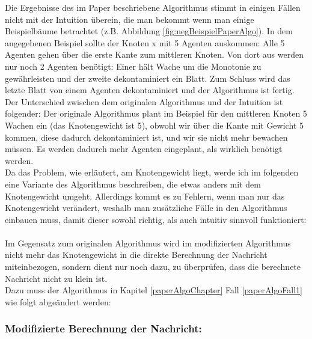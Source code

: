 Die Ergebnisse des im Paper beschriebene Algorithmus stimmt in einigen Fällen nicht mit der Intuition überein, die man bekommt wenn man einige Beispielbäume betrachtet (z.B. Abbildung \ref{fig:negBeispielPaperAlgo}). In dem  angegebenen Beispiel sollte der Knoten x mit 5 Agenten auskommen: Alle 5 Agenten gehen über die erste Kante zum mittleren Knoten. Von dort aus werden nur noch 2 Agenten benötigt: Einer hält Wache um die Monotonie zu gewährleisten und der zweite dekontaminiert ein Blatt. Zum Schluss wird das letzte Blatt von einem Agenten dekontaminiert und der Algorithmus ist fertig.
\\
Der Unterschied zwischen dem originalen Algorithmus und der Intuition ist folgender: Der originale Algorithmus plant im Beispiel für den mittleren Knoten 5 Wachen ein (das Knotengewicht ist 5), obwohl wir über die Kante mit Gewicht 5 kommen, diese dadurch dekontaminiert ist, und wir sie nicht mehr bewachen müssen. Es werden dadurch mehr Agenten eingeplant, als wirklich benötigt werden.
\\
Da das Problem, wie erläutert, am Knotengewicht liegt, werde ich im folgenden eine Variante des Algorithmus beschreiben, die etwas anders mit dem Knotengewicht umgeht. Allerdings kommt es zu Fehlern, wenn man nur das Knotengewicht verändert, weshalb man zusätzliche Fälle in den Algorithmus einbauen muss, damit dieser sowohl richtig, als auch intuitiv sinnvoll funktioniert:
\\
\\
Im Gegensatz zum originalen Algorithmus wird im modifizierten Algorithmus nicht mehr das Knotengewicht in die direkte Berechnung der Nachricht miteinbezogen, sondern dient nur noch dazu, zu überprüfen, dass die berechnete Nachricht nicht zu klein ist.
\\
Dazu muss der Algorithmus in Kapitel \ref{paperAlgoChapter} Fall \ref{paperAlgoFall1} wie folgt abgeändert werden:

\subsubsection*{Modifizierte Berechnung der Nachricht:}

